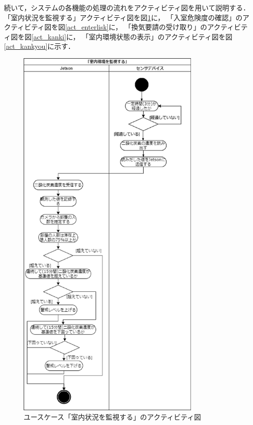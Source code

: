 続いて，システムの各機能の処理の流れをアクティビティ図を用いて説明する．
「室内状況を監視する」アクティビティ図を図\ref{act_kanshi}に，
「入室危険度の確認」のアクティビティ図を図\ref{act_enterlisk}に，
「換気要請の受け取り」のアクティビティ図を図\ref{act_kanki}に，
「室内環境状態の表示」のアクティビティ図を図\ref{act_kankyou}に示す．
\begin{figure}[htbp]
    \centering
    \includegraphics[width = 9cm]{./picture/activity_kanshi_1.eps}
    \caption{ユースケース「室内状況を監視する」のアクティビティ図}
    \label{act_kanshi}
\end{figure}

